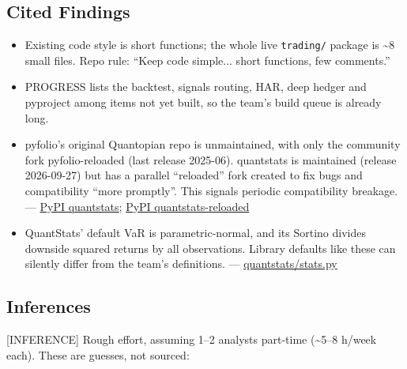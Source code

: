 \documentclass{article}
\begin{document}
\subsection{Cited Findings}

\begin{itemize}

\item [REPO] Existing code style is short functions; the whole live \texttt{trading/\allowbreak{}} package is \textasciitilde{}8 small files. Repo rule: ``Keep code simple... short functions, few comments.''

\item [REPO] PROGRESS lists the backtest, signals routing, HAR, deep hedger and pyproject among items not yet built, so the team's build queue is already long.

\item pyfolio's original Quantopian repo is unmaintained, with only the community fork pyfolio-reloaded (last release 2025-06). quantstats is maintained (release 2026-09-27) but has a parallel ``reloaded'' fork created to fix bugs and compatibility ``more promptly''. This signals periodic compatibility breakage. --- \href{https://pypi.org/project/quantstats/}{PyPI quantstats}; \href{https://pypi.org/project/quantstats-reloaded/}{PyPI quantstats-reloaded}

\item QuantStats' default VaR is parametric-normal, and its Sortino divides downside squared returns by all observations. Library defaults like these can silently differ from the team's definitions. --- \href{https://raw.githubusercontent.com/ranaroussi/quantstats/main/quantstats/stats.py}{quantstats/\allowbreak{}stats.py}

\end{itemize}

\subsection{Inferences}

[INFERENCE] Rough effort, assuming 1--2 analysts part-time (\textasciitilde{}5--8 h/\allowbreak{}week each). These are guesses, not sourced:
\end{document}
